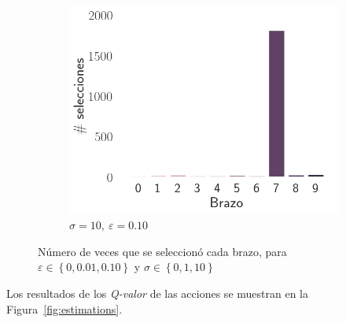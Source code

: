 \documentclass[12pt]{article}
\begin{document}
\begin{figure}[H]
\begin{subfigure}[H]{0.3\textwidth}
            \includegraphics[width=\textwidth]{../img/2000/arm_sigma_10_epsilon_0.1}
            \caption{$\sigma=10 ,\ \varepsilon=0.10$}
            \label{fig:arms_selected_10_0.1}
        \end{subfigure}

        \caption{Número de veces que se seleccionó cada brazo, para $\varepsilon \in \left\{ 0, 0.01, 0.10 \right\}$ y $\sigma \in \left\{ 0, 1, 10 \right\}$}
        \label{fig:arms_selected}
    \end{figure}

    Los resultados de los \textit{Q-valor} de las acciones se muestran en la Figura~\ref{fig:estimations}.
\end{document}
